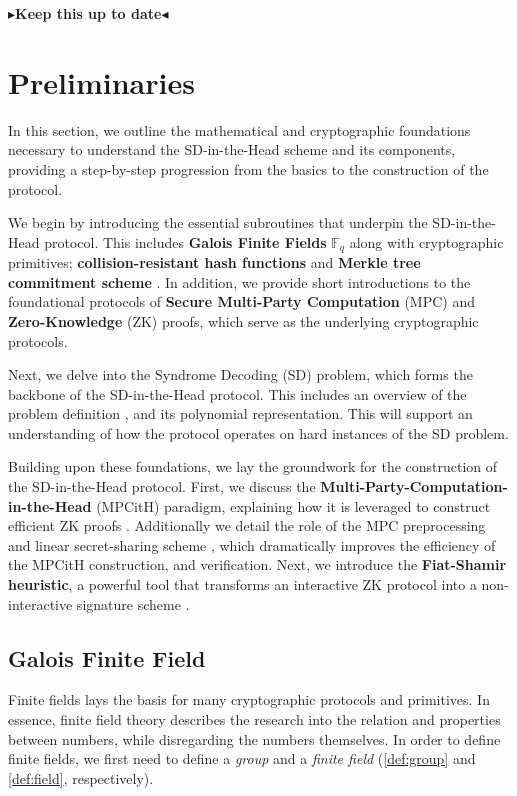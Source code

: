 \documentclass[twoside,11pt,openright]{report}
\theoremstyle{definition}
\theoremstyle{plain}
\newcommand{\todo}[1]{{\color[rgb]{.5,0,0}\textbf{$\blacktriangleright$#1$\blacktriangleleft$}}}
\begin{document}
\todo{Keep this up to date}


\chapter{Preliminaries}\label{ch:prelim}

In this section, we outline the mathematical and cryptographic foundations necessary to understand the SD-in-the-Head scheme and its components, providing a step-by-step progression from the basics to the construction of the protocol.

We begin by introducing the essential subroutines that underpin the SD-in-the-Head protocol. This includes \textbf{Galois Finite Fields} $\mathbb{F}_q$ \cite{martinez2023syndromes, reed1960polynomial, brownadvanced} along with cryptographic primitives; \textbf{collision-resistant hash functions} and \textbf{Merkle tree commitment scheme} \cite{becker2008merkle}. In addition, we provide short introductions to the foundational protocols of \textbf{Secure Multi-Party Computation} (MPC) and \textbf{Zero-Knowledge} (ZK) proofs, which serve as the underlying cryptographic protocols.

Next, we delve into the Syndrome Decoding (SD) problem, which forms the backbone of the SD-in-the-Head protocol. This includes an overview of the problem definition \cite{aguilarsyndrome11, mceliece1978public, berlekamp1978inherent, baldi2013optimization}, and its polynomial representation. This will support an understanding of how the protocol operates on hard instances of the SD problem.

Building upon these foundations, we lay the groundwork for the construction of the SD-in-the-Head protocol. First, we discuss the \textbf{Multi-Party-Computation-in-the-Head} (MPCitH) paradigm, explaining how it is leveraged to construct efficient ZK proofs \cite{ishai2007zero}. Additionally we detail the role of the MPC preprocessing \cite{baum2020concretely} and linear secret-sharing scheme \cite{feneuil2023threshold}, which dramatically improves the efficiency of the MPCitH construction, and verification. Next, we introduce the \textbf{Fiat-Shamir heuristic}, a powerful tool that transforms an interactive ZK protocol into a non-interactive signature scheme \cite{fiat1986prove}.

\section{Galois Finite Field}\label{sec:gf256}
Finite fields lays the basis for many cryptographic protocols and primitives. In essence, finite field theory describes the research into the relation and properties between numbers, while disregarding the numbers themselves. In order to define finite fields, we first need to define a \textit{group} and a \textit{finite field} (\autoref{def:group} and \autoref{def:field}, respectively).
\end{document}
